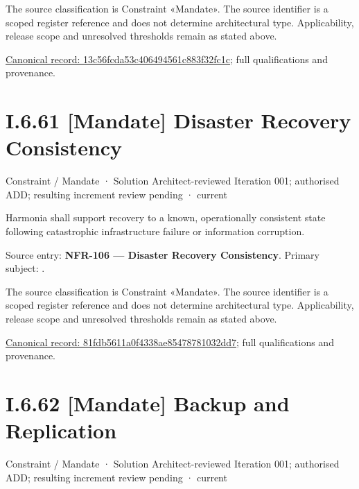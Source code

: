 The source classification is Constraint «Mandate». The source identifier is a scoped register reference and does not determine architectural type. Applicability, release scope and unresolved thresholds remain as stated above.


{\footnotesize \href{../../../../../../../continuum/motivation/constraint/mandate/13c56fcda53c406494561c883f32fc1c.md}{Canonical record: 13c56fcda53c406494561c883f32fc1c}; full qualifications and provenance.}\par
\section*{I.6.61 [Mandate] Disaster Recovery Consistency}
\label{navigation:I.6.61}

\label{element:81fdb5611a0f4338ae85478781032dd7}
{\small Constraint / Mandate · Solution Architect-reviewed Iteration 001; authorised ADD; resulting increment review pending · current}\par

Harmonia shall support recovery to a known, operationally consistent state following catastrophic infrastructure failure or information corruption.



Source entry: \textbf{NFR-106 — Disaster Recovery Consistency}. Primary subject: \texttt{}.



The source classification is Constraint «Mandate». The source identifier is a scoped register reference and does not determine architectural type. Applicability, release scope and unresolved thresholds remain as stated above.


{\footnotesize \href{../../../../../../../continuum/motivation/constraint/mandate/81fdb5611a0f4338ae85478781032dd7.md}{Canonical record: 81fdb5611a0f4338ae85478781032dd7}; full qualifications and provenance.}\par
\section*{I.6.62 [Mandate] Backup and Replication}
\label{navigation:I.6.62}

\label{element:8731f88e202a4f5dacb408e5a1d474a8}
{\small Constraint / Mandate · Solution Architect-reviewed Iteration 001; authorised ADD; resulting increment review pending · current}\par

